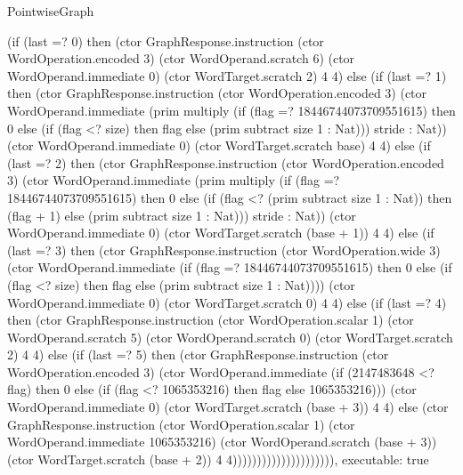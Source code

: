 \begin{lexlean}{PointwiseGraph}
\begin{semanticmodule}
{      (if (last =? 0) then (ctor GraphResponse.instruction (ctor WordOperation.encoded 3) (ctor WordOperand.scratch 6) (ctor WordOperand.immediate 0) (ctor WordTarget.scratch 2) 4 4) else (if (last =? 1) then (ctor GraphResponse.instruction (ctor WordOperation.encoded 3) (ctor WordOperand.immediate (prim multiply (if (flag =? 18446744073709551615) then 0 else (if (flag <? size) then flag else (prim subtract size 1 : Nat))) stride : Nat)) (ctor WordOperand.immediate 0) (ctor WordTarget.scratch base) 4 4) else (if (last =? 2) then (ctor GraphResponse.instruction (ctor WordOperation.encoded 3) (ctor WordOperand.immediate (prim multiply (if (flag =? 18446744073709551615) then 0 else (if (flag <? (prim subtract size 1 : Nat)) then (flag + 1) else (prim subtract size 1 : Nat))) stride : Nat)) (ctor WordOperand.immediate 0) (ctor WordTarget.scratch (base + 1)) 4 4) else (if (last =? 3) then (ctor GraphResponse.instruction (ctor WordOperation.wide 3) (ctor WordOperand.immediate (if (flag =? 18446744073709551615) then 0 else (if (flag <? size) then flag else (prim subtract size 1 : Nat)))) (ctor WordOperand.immediate 0) (ctor WordTarget.scratch 0) 4 4) else (if (last =? 4) then (ctor GraphResponse.instruction (ctor WordOperation.scalar 1) (ctor WordOperand.scratch 5) (ctor WordOperand.scratch 0) (ctor WordTarget.scratch 2) 4 4) else (if (last =? 5) then (ctor GraphResponse.instruction (ctor WordOperation.encoded 3) (ctor WordOperand.immediate (if (2147483648 <? flag) then 0 else (if (flag <? 1065353216) then flag else 1065353216))) (ctor WordOperand.immediate 0) (ctor WordTarget.scratch (base + 3)) 4 4) else (ctor GraphResponse.instruction (ctor WordOperation.scalar 1) (ctor WordOperand.immediate 1065353216) (ctor WordOperand.scratch (base + 3)) (ctor WordTarget.scratch (base + 2)) 4 4))))))))))))))))))))),
  executable: true
}


\end{semanticmodule}
\end{lexlean}
